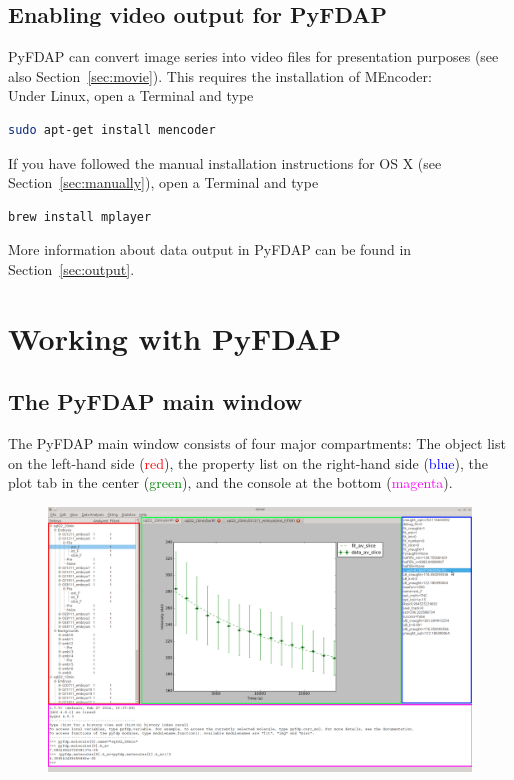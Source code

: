 \documentclass[a4paper,11pt]{article}
\begin{document}
\subsection{Enabling video output for PyFDAP}
\label{sec:video}

PyFDAP can convert image series into video files for presentation purposes (see also Section~\ref{sec:movie}). This requires the installation of MEncoder:\\

\noindent Under Linux, open a Terminal and type

\begin{lstlisting}[frame=single,language=bash]  
sudo apt-get install mencoder
\end{lstlisting}

\noindent If you have followed the manual installation instructions for OS X (see Section~\ref{sec:manually}), open a Terminal and type

\begin{lstlisting}[frame=single,language=bash]  
brew install mplayer
\end{lstlisting}

\noindent More information about data output in PyFDAP can be found in Section~\ref{sec:output}.

\section{Working with PyFDAP}

\subsection{The PyFDAP main window}
The PyFDAP main window consists of four major compartments: The object list on the left-hand side (\textcolor{red}{red}), the property list on the right-hand side (\textcolor{blue}{blue}), the plot tab in the center (\textcolor{green}{green}), and the console at the bottom (\textcolor{magenta}{magenta}).

\begin{figure}[H]
  \centering
  \includegraphics[scale=0.1925]{figs/pyfdp_mainframe_rect.png}
 \end{figure}
\end{document}

